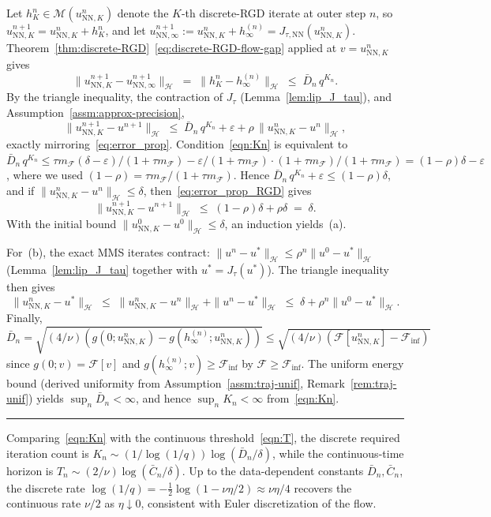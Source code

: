 \documentclass[twoside,11pt]{article}
\newcommand{\BlackBoxProof}{\rule{1.5ex}{1.5ex}}
\renewenvironment{proof}{\par\noindent{\bf Proof\ }}{\hfill\BlackBoxProof\par\medskip}
\newcommand{\rev}[1]{#1}                           %
\newcommand{\NN}{\mathrm{NN}}
\newcommand{\calF}{\mathcal{F}}
\newcommand{\calH}{\mathcal{H}}
\newcommand{\calM}{\mathcal{M}}
\begin{document}
\begin{proof}
Let $h^n_K\in\calM(u^n_{\NN,K})$ denote the $K$-th discrete-RGD iterate at outer step $n$, so $u^{n+1}_{\NN,K}=u^n_{\NN,K}+h^n_K$, and let $u^{n+1}_{\NN,\infty}:=u^n_{\NN,K}+h^{(n)}_\infty=J_{\tau,\NN}(u^n_{\NN,K})$. Theorem~\ref{thm:discrete-RGD}~\eqref{eq:discrete-RGD-flow-gap} applied at $v=u^n_{\NN,K}$ gives
\[
\|u^{n+1}_{\NN,K}-u^{n+1}_{\NN,\infty}\|_\calH \;=\; \|h^n_K-h^{(n)}_\infty\|_\calH \;\le\; \bar D_n\,q^{K_n}.
\]
By the triangle inequality, the contraction of $J_\tau$ (Lemma~\ref{lem:lip_J_tau}), and Assumption~\ref{assm:approx-precision},
\begin{equation}\label{eq:error_prop_RGD}
    \|u^{n+1}_{\NN,K}-u^{n+1}\|_\calH \;\le\; \bar D_n\,q^{K_n} + \varepsilon + \rho\,\|u^n_{\NN,K}-u^n\|_\calH,
\end{equation}
exactly mirroring~\eqref{eq:error_prop}. Condition~\eqref{eqn:Kn} is equivalent to $\bar D_n\,q^{K_n}\le \tau m_\calF(\delta-\varepsilon)/(1+\tau m_\calF) -\varepsilon/(1+\tau m_\calF)\cdot(1+\tau m_\calF)/(1+\tau m_\calF) = (1-\rho)\delta-\varepsilon$, where we used $(1-\rho) = \tau m_\calF/(1+\tau m_\calF)$. Hence $\bar D_n\,q^{K_n}+\varepsilon\le (1-\rho)\delta$, and if $\|u^n_{\NN,K}-u^n\|_\calH\le\delta$, then~\eqref{eq:error_prop_RGD} gives
\[
\|u^{n+1}_{\NN,K}-u^{n+1}\|_\calH \;\le\; (1-\rho)\delta + \rho\delta \;=\; \delta.
\]
With the initial bound $\|u^0_{\NN,K}-u^0\|_\calH\le\delta$, an induction yields~(a).

For~(b), the exact MMS iterates contract: $\|u^n-u^*\|_\calH\le\rho^n\|u^0-u^*\|_\calH$ (Lemma~\ref{lem:lip_J_tau} together with $u^*=J_\tau(u^*)$). The triangle inequality then gives
\[
\|u^n_{\NN,K}-u^*\|_\calH \;\le\; \|u^n_{\NN,K}-u^n\|_\calH + \|u^n-u^*\|_\calH \;\le\; \delta + \rho^n\|u^0-u^*\|_\calH.
\]
Finally, $\bar D_n = \sqrt{(4/\nu)(g(0;u^n_{\NN,K})-g(h^{(n)}_\infty;u^n_{\NN,K}))} \le \sqrt{(4/\nu)(\calF[u^n_{\NN,K}]-\calF_{\inf})}$ since $g(0;v)=\calF[v]$ and $g(h^{(n)}_\infty;v)\ge\calF_{\inf}$ by $\calF\ge\calF_{\inf}$. The uniform energy bound (derived uniformity from Assumption~\ref{assm:traj-unif}, Remark~\ref{rem:traj-unif}) yields $\sup_n\bar D_n<\infty$, and hence $\sup_n K_n<\infty$ from~\eqref{eqn:Kn}.
\end{proof}

\rev{%
\begin{remark}\label{rem:discrete-RGD-vs-RGF}
Comparing~\eqref{eqn:Kn} with the continuous threshold~\eqref{eqn:T}, the discrete required iteration count is $K_n \sim (1/\log(1/q))\log(\bar D_n/\delta)$, while the continuous-time horizon is $T_n \sim (2/\nu)\log(\bar C_n/\delta)$. Up to the data-dependent constants $\bar D_n, \bar C_n$, the discrete rate $\log(1/q) = -\tfrac12\log(1-\nu\eta/2) \approx \nu\eta/4$ recovers the continuous rate $\nu/2$ as $\eta\downarrow 0$, consistent with Euler discretization of the flow.
\end{remark}
}
\end{document}
